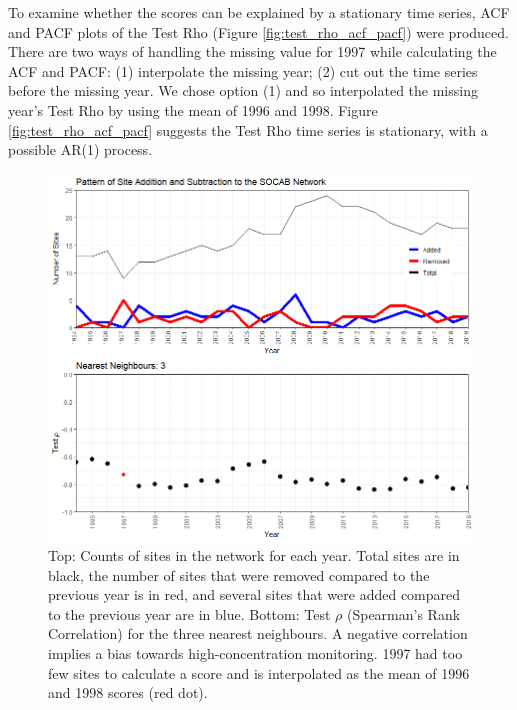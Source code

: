 To examine whether the scores can be explained by a stationary time series, ACF and PACF plots of the Test Rho (Figure \ref{fig:test_rho_acf_pacf}) were produced.  There are two ways of handling the missing value for 1997 while calculating the ACF and PACF:  (1) interpolate the missing year; (2) cut out the time series before the missing year.  We chose option (1) and so interpolated the missing year's Test Rho by using the mean of 1996 and 1998.  Figure \ref{fig:test_rho_acf_pacf} suggests the Test Rho time series is stationary, with a possible AR(1) process.  

\begin{figure}
	\centering
	\includegraphics[width = 
	\textwidth]{Figures/PreferentialSampling/PrefSmpl_nonn3combine_siteCounts_TestRho.png}
	\caption{Top:  Counts of sites in the network for each year.  Total sites are in black, the number of sites that were removed compared to the previous year is in red, and several sites that were added compared to the previous year are in blue. 
		Bottom: Test $\rho$ (Spearman's Rank Correlation) for the three nearest neighbours.  A negative correlation implies a bias towards high-concentration monitoring. 1997 had too few sites to calculate a score and is interpolated as the mean of 1996 and 1998 scores (red dot).}
\label{fig:PS_site_counts_test_rho}
\end{figure}

